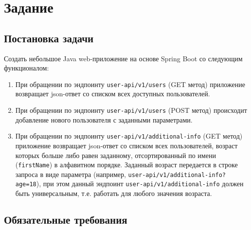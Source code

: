 \documentclass[a4paper, 14pt]{article}
\begin{document}
\large
\tableofcontents

\newpage
\section{Задание}

\subsection{Постановка задачи}

Создать небольшое Java web-приложение на основе Spring Boot со следующим функционалом:

\begin{enumerate}
	\item При обращении по эндпоинту \texttt{user-api/v1/users} (GET метод) приложение возвращает json-ответ со списком всех доступных пользователей.
	\item При обращении по эндпоинту \texttt{user-api/v1/users} (POST метод) происходит добавление нового пользователя с заданными параметрами.
	\item При обращении по эндпоинту \texttt{user-api/v1/additional-info} (GET метод) приложение возвращает json-ответ со списком всех пользователей, возраст которых больше либо равен заданному, отсортированный по имени (\texttt{firstName}) в алфавитном порядке. Заданный возраст передается в строке запроса в виде параметра (например, \texttt{user-api/v1/additional-info?age=18}), при этом данный эндпоинт \texttt{user-api/v1/additional-info} должен быть универсальным, т.е. работать для любого значения возраста.
\end{enumerate}

\subsection{Обязательные требования}
\end{document}
